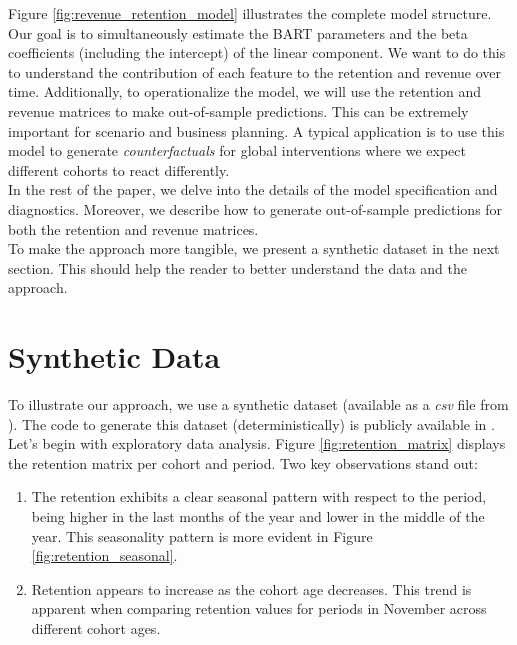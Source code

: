 \documentclass[11pt]{amsart}
\theoremstyle{definition}
\begin{document}
Figure \ref{fig:revenue_retention_model} illustrates the complete model structure. Our goal is to simultaneously estimate
the BART parameters and the beta coefficients (including the intercept) of the linear component. We want to do this to
understand the contribution of each feature to the retention and revenue over time. Additionally, to operationalize the
model, we will use the retention and revenue matrices to make out-of-sample predictions. This can be extremely important
for scenario and business planning. A typical application is to use this model to generate {\em counterfactuals} for
global interventions where we expect different cohorts to react differently. \\

In the rest of the paper, we delve into the details of the model specification and diagnostics. Moreover, we describe
how to generate out-of-sample predictions for both the retention and revenue matrices. \\

To make the approach more tangible,
we present a synthetic dataset in the next section. This should help the reader to better understand the data and the approach.

\section{Synthetic Data}

To illustrate our approach, we use a synthetic dataset (available as a {\em csv} file from \cite{orduz_revenue_retention}).
The code to generate this dataset (deterministically) is publicly available in \cite{orduz_revenue_retention_data_code}.
Let's begin with exploratory data analysis. Figure \ref{fig:retention_matrix} displays the retention matrix per cohort and
period. Two key observations stand out:

\begin{enumerate}
    \item The retention exhibits a clear seasonal pattern with respect to the period, being higher in the last months of the
          year and lower in the middle of the year. This seasonality pattern is more evident in Figure
          \ref{fig:retention_seasonal}.
    \item Retention appears to increase as the cohort age decreases. This trend is apparent when comparing retention values
          for periods in November across different cohort ages.
\end{enumerate}
\end{document}
